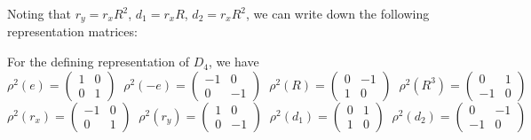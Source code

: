 \documentclass[]{ctexart}
\begin{document}
Noting that $r_y=r_xR^2$, $d_1=r_x R$, $d_2=r_xR^2$, we can write down the following representation matrices: 

For the defining representation of $D_4$, we have 
\begin{equation*}
\rho^2(e)=\begin{pmatrix}
1 & 0 \\ 0 & 1
\end{pmatrix}\;\;\rho^2(-e)=\begin{pmatrix}
-1 & 0 \\ 0 & -1
\end{pmatrix}\;\;\rho^2(R)=\begin{pmatrix}
0 & -1 \\ 1 & 0
\end{pmatrix}\;\;\rho^2(R^3)=\begin{pmatrix}
0 & 1 \\ -1 & 0
\end{pmatrix}
\end{equation*}
\begin{equation*}
\rho^2(r_x)=\begin{pmatrix}
-1 & 0\\ 0 & 1
\end{pmatrix}\;\;\rho^2(r_y)=\begin{pmatrix}
1 & 0 \\ 0 & -1
\end{pmatrix}\;\;\rho^2(d_1)=\begin{pmatrix}
0 & 1 \\ 1 & 0
\end{pmatrix}\;\;\rho^2(d_2)=\begin{pmatrix}
0 & -1 \\ -1 & 0
\end{pmatrix}
\end{equation*}
\end{document}
